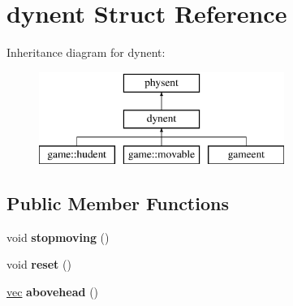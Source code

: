 \hypertarget{structdynent}{}\section{dynent Struct Reference}
\label{structdynent}
Inheritance diagram for dynent\+:\begin{figure}[H]
\begin{center}
\leavevmode
\includegraphics[height=3.000000cm]{structdynent}
\end{center}
\end{figure}
\subsection*{Public Member Functions}
\begin{DoxyCompactItemize}
\item 
\mbox{\label{structdynent_a5aad02ec178807bec16f71b778e13857}} 
void {\bfseries stopmoving} ()
\item 
\mbox{\label{structdynent_acf4e18ebbdad44d9c8ca4ca2a33e350f}} 
void {\bfseries reset} ()
\item 
\mbox{\label{structdynent_aab7f1db95239110fb0869f955e209e21}} 
\hyperlink{structvec}{vec} {\bfseries abovehead} ()
\end{DoxyCompactItemize}
